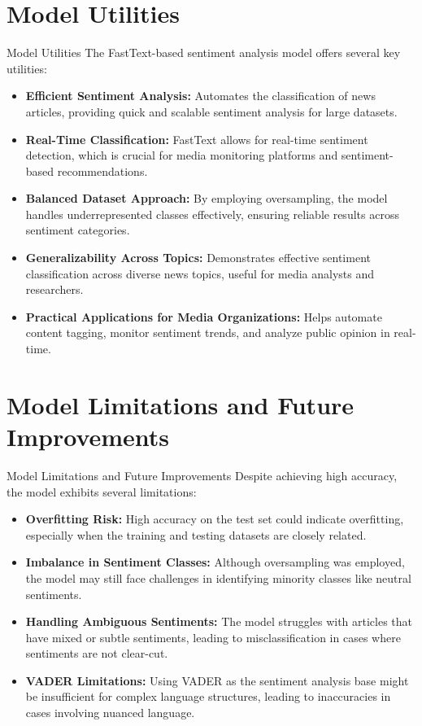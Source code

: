 \documentclass{beamer}
\begin{document}
\section{Model Utilities}
\begin{frame}{Model Utilities}
    The FastText-based sentiment analysis model offers several key utilities:
    \begin{itemize}
        \item \textbf{Efficient Sentiment Analysis:} Automates the classification of news articles, providing quick and scalable sentiment analysis for large datasets.
        \item \textbf{Real-Time Classification:} FastText allows for real-time sentiment detection, which is crucial for media monitoring platforms and sentiment-based recommendations.
        \item \textbf{Balanced Dataset Approach:} By employing oversampling, the model handles underrepresented classes effectively, ensuring reliable results across sentiment categories.
        \item \textbf{Generalizability Across Topics:} Demonstrates effective sentiment classification across diverse news topics, useful for media analysts and researchers.
        \item \textbf{Practical Applications for Media Organizations:} Helps automate content tagging, monitor sentiment trends, and analyze public opinion in real-time.
    \end{itemize}
\end{frame}

\section{Model Limitations and Future Improvements}
\begin{frame}{Model Limitations and Future Improvements}
    Despite achieving high accuracy, the model exhibits several limitations:
    \begin{itemize}
        \item \textbf{Overfitting Risk:} High accuracy on the test set could indicate overfitting, especially when the training and testing datasets are closely related.
        \item \textbf{Imbalance in Sentiment Classes:} Although oversampling was employed, the model may still face challenges in identifying minority classes like neutral sentiments.
        \item \textbf{Handling Ambiguous Sentiments:} The model struggles with articles that have mixed or subtle sentiments, leading to misclassification in cases where sentiments are not clear-cut.
        \item \textbf{VADER Limitations:} Using VADER as the sentiment analysis base might be insufficient for complex language structures, leading to inaccuracies in cases involving nuanced language.
    \end{itemize}
\end{frame}
\end{document}
